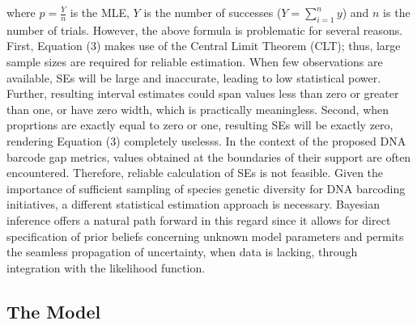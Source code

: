\documentclass[12pt]{article}
\begin{document}
\noindent where $\hat{p} = \frac{Y}{n}$ is the MLE, $Y$ is the number of successes ($Y = \sum_{i=1}^n{y}$) and $n$ is the number of trials. However, the above formula is problematic for several reasons. First, Equation (3) makes use of the Central Limit Theorem (CLT); thus, large sample sizes are required for reliable estimation. When few observations are available, SEs will be large and inaccurate, leading to low statistical power. Further, resulting interval estimates could span values less than zero or greater than one, or have zero width, which is practically meaningless. Second, when proprtions are exactly equal to zero or one, resulting SEs will be exactly zero, rendering Equation (3) completely uselesss. In the context of the proposed DNA barcode gap metrics, values obtained at the boundaries of their support are often encountered. Therefore, reliable calculation of SEs is not feasible. Given the importance of sufficient sampling of species genetic diversity for DNA barcoding initiatives, a different statistical estimation approach is necessary. Bayesian inference offers a natural path forward in this regard since it allows for direct specification of prior beliefs concerning unknown model parameters and permits the seamless propagation of uncertainty, when data is lacking, through integration with the likelihood function.

\subsection{The Model}
\end{document}
